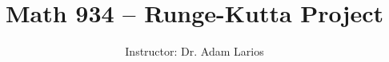 \documentclass[10pt,reqno]{amsart}
\theoremstyle{plain}
\theoremstyle{definition}
\theoremstyle{remark}
\numberwithin{figure}{section}   %
\begin{document}
\title{Math 934 -- Runge-Kutta Project
}
\author{Instructor: Dr. Adam Larios}
\maketitle
\thispagestyle{empty}
\pagestyle{empty}

% 
\end{document}
